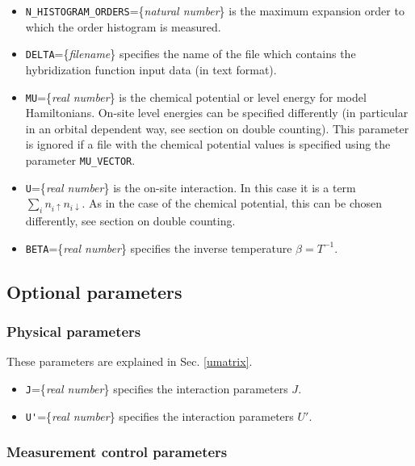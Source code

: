\documentclass[aps,prb,floatfix,superscriptaddress,twocolumn,notitlepage]{revtex4-1}
\begin{document}
\begin{itemize}
\item \verb#N_HISTOGRAM_ORDERS#=\{\emph{natural number}\} is the maximum expansion order to which the order histogram is measured. 
\item \verb#DELTA#=\{\emph{filename}\} specifies the name of the file which contains the hybridization function input data (in text format).
\item \verb#MU#=\{\emph{real number}\} is the chemical potential or level energy for model Hamiltonians. On-site level energies can be specified differently (in particular in an orbital dependent way, see section on double counting). This parameter is ignored if a file with the chemical potential values is specified using the parameter \verb#MU_VECTOR#.
\item \verb#U#=\{\emph{real number}\} is the on-site interaction. In this case it is a term $\sum_i n_{i\uparrow}n_{i\downarrow}$. As in the case of the chemical potential, this can be chosen differently, see section on double counting.
\item \verb#BETA#=\{\emph{real number}\} specifies the inverse temperature $\beta=T^{-1}$.
\end{itemize}

\subsection{Optional parameters}

\subsubsection{Physical parameters}

These parameters are explained in Sec. \ref{umatrix}.
\begin{itemize}
\item \verb#J#=\{\emph{real number}\} specifies the interaction parameters $J$.
\item \verb#U'#=\{\emph{real number}\} specifies the interaction parameters $U'$.
\end{itemize}

\subsubsection{Measurement control parameters}
\end{document}
